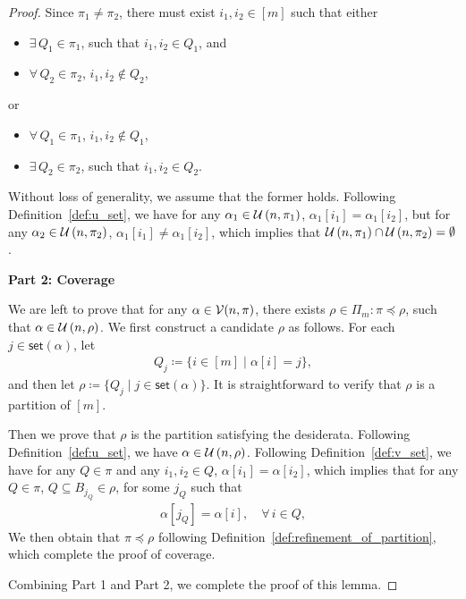 \documentclass[letterpaper,11pt]{article}
\newcommand{\sPi}{\pi}
\newcommand{\uset}{\calU}
\newcommand{\usetnm}[2]{\uset\left(#1,#2\right)}
\newcommand{\vset}{\calV}
\newcommand{\vsetp}[2]{\vset(#1,#2)}
\newcommand{\takesetp}[1]{\mathsf{set}(#1)}
\newcommand{\partition}{\Pi}
\newcommand{\partitionp}[1]{\partition_{#1}}
\newcommand{\pleq}{\preceq}
\begin{document}
\begin{bibunit}[plainnat]
\begin{proof}
    Since $\pi_1 \neq \pi_2$, there must exist $i_1, i_2 \in [m]$ such that either
    \begin{itemize}
        \item $\exists \, Q_1 \in \pi_1$, such that $i_1, i_2 \in Q_1$, and
        \item $\forall \, Q_2 \in \pi_2$, $i_1, i_2 \notin Q_2$, 
    \end{itemize}
    or 
    \begin{itemize}
        \item $\forall \, Q_1 \in \pi_1$, $i_1, i_2 \notin Q_1$, 
        \item $\exists \, Q_2 \in \pi_2$, such that $i_1, i_2 \in Q_2$.  
    \end{itemize}
    Without loss of generality, we assume that the former holds. Following Definition~\ref{def:u_set}, we have for any $\alpha_1 \in \usetnm{n}{\pi_1}$, $\alpha_1[i_1] = \alpha_1[i_2]$, but for any $\alpha_2 \in \usetnm{n}{\pi_2}$, $\alpha_1[i_1] \neq \alpha_1[i_2]$, which implies that $\usetnm{n}{\pi_1} \cap \usetnm{n}{\pi_2} = \emptyset$. 

    {\bf Part 2: Coverage}

    We are left to prove that for any $\alpha \in \vsetp{n}{\sPi}$, there exists $\rho \in \partitionp{m}: \sPi \pleq \rho$, such that $\alpha \in \usetnm{n}{\rho}$. We first construct a candidate $\rho$ as follows. For each $j \in \takesetp{\alpha}$, let
    \begin{align*}
    Q_j \coloneqq \{i \in [m] \mid \alpha[i] = j\},
    \end{align*}
    and then let $\rho \coloneqq \{Q_j \mid j \in \takesetp{\alpha}\}$. It is straightforward to verify that $\rho$ is a partition of $[m]$. 
    
    Then we prove that $\rho$ is the partition satisfying the desiderata. Following Definition~\ref{def:u_set}, we have $\alpha \in \usetnm{n}{\rho}$. Following Definition~\ref{def:v_set}, we have for any $Q \in \sPi$ and any $i_1, i_2 \in Q$, $\alpha[i_1] = \alpha[i_2]$, which implies that for any $Q \in \pi$, $Q \subseteq B_{j_Q} \in \rho$, for some $j_Q$ such that
    \begin{align*}
        \alpha[j_Q] = \alpha[i], \quad \forall \, i \in Q, 
    \end{align*}
    We then obtain that $\sPi \pleq \rho$ following Definition~\ref{def:refinement_of_partition}, which complete the proof of coverage. 

    Combining Part 1 and Part 2, we complete the proof of this lemma. 
\end{proof}


\end{bibunit}
\end{document}
